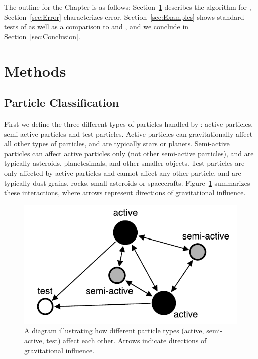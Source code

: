 The outline for the Chapter is as follows: Section~\ref{sec:Methods} describes the algorithm for \hermes, Section~\ref{sec:Error} characterizes error, Section~\ref{sec:Examples} shows standard tests of \hermes as well as a comparison to \symba and \mercury, and we conclude in Section~\ref{sec:Conclusion}.

\section{Methods}
\label{sec:Methods}

\subsection{Particle Classification}
First we define the three different types of particles handled by \hermes: active particles, semi-active particles and test particles. 
Active particles can gravitationally affect all other types of particles, and are typically stars or planets.
Semi-active particles can affect active particles only (not other semi-active particles), and are typically asteroids, planetesimals, and other smaller objects.
Test particles are only affected by active particles and cannot affect any other particle, and are typically dust grains, rocks, small asteroids or spacecrafts. 
Figure~\ref{fig:bodies} summarizes these interactions, where arrows represent directions of gravitational influence.

\begin{figure}
\centerline{\includegraphics[scale=0.6]{chap4/images/bodies.pdf}}
\caption{A diagram illustrating how different particle types (active, semi-active, test) affect each other. Arrows indicate directions of gravitational influence.
 }
\label{fig:bodies}
\end{figure}

